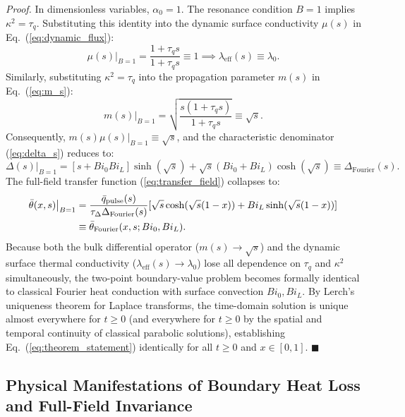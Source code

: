 \documentclass[preprint,12pt]{elsarticle}
\begin{document}
\textit{Proof.} In dimensionless variables, $\alpha_0 = 1$. The resonance condition $B = 1$ implies $\kappa^2 = \tau_q$. Substituting this identity into the dynamic surface conductivity $\mu(s)$ in Eq.~(\ref{eq:dynamic_flux}):
\begin{equation}
\mu(s)\big|_{B=1} = \frac{1 + \tau_q s}{1 + \tau_q s} \equiv 1 \implies \lambda_{\mathrm{eff}}(s) \equiv \lambda_0.
\end{equation}
Similarly, substituting $\kappa^2 = \tau_q$ into the propagation parameter $m(s)$ in Eq.~(\ref{eq:m_s}):
\begin{equation}
m(s)\big|_{B=1} = \sqrt{\frac{s(1 + \tau_q s)}{1 + \tau_q s}} \equiv \sqrt{s}.
\end{equation}
Consequently, $m(s)\mu(s)\big|_{B=1} \equiv \sqrt{s}$, and the characteristic denominator (\ref{eq:delta_s}) reduces to:
\begin{equation}
\Delta(s)\big|_{B=1} = [s + Bi_0 Bi_L]\sinh(\sqrt{s}) + \sqrt{s}(Bi_0 + Bi_L)\cosh(\sqrt{s}) \equiv \Delta_{\mathrm{Fourier}}(s).
\end{equation}
The full-field transfer function (\ref{eq:transfer_field}) collapses to:
\begin{align}
\bar{\theta}(x, s)\big|_{B=1} &= \frac{\bar{q}_{\mathrm{pulse}}(s)}{\tau_\Delta \Delta_{\mathrm{Fourier}}(s)} [\sqrt{s}\cosh(\sqrt{s}(1 - x)) + Bi_L \sinh(\sqrt{s}(1 - x))] \notag \\
&\equiv \bar{\theta}_{\mathrm{Fourier}}(x, s; Bi_0, Bi_L).
\end{align}
Because both the bulk differential operator ($m(s) \to \sqrt{s}$) and the dynamic surface thermal conductivity ($\lambda_{\mathrm{eff}}(s) \to \lambda_0$) lose all dependence on $\tau_q$ and $\kappa^2$ simultaneously, the two-point boundary-value problem becomes formally identical to classical Fourier heat conduction with surface convection $Bi_0, Bi_L$. By Lerch's uniqueness theorem for Laplace transforms, the time-domain solution is unique almost everywhere for $t \ge 0$ (and everywhere for $t \ge 0$ by the spatial and temporal continuity of classical parabolic solutions), establishing Eq.~(\ref{eq:theorem_statement}) identically for all $t \ge 0$ and $x \in [0, 1]$. $\blacksquare$

\subsection{Physical Manifestations of Boundary Heat Loss and Full-Field Invariance}
\end{document}
